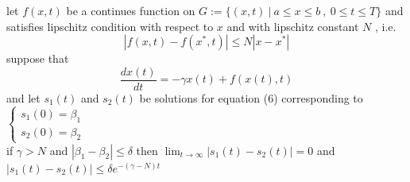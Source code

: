\documentclass[]{article}
\begin{document}
\begin{theorem}[]
    let $f(x,t)$ be a continues function on $G:=\{(x,t) \ | \ a\leq x\leq b \ , \ 0\leq t \leq T\}$ and
    \\
    satisfies lipschitz condition with respect to $x$ and with lipschitz constant $N$ , i.e.
    \[
        \left\lvert f(x,t) - f(x^*,t)\right\rvert \leq N \left\lvert x - x^*\right\rvert      
    \]
    suppose that 
    \begin{equation}
        \frac{dx(t)}{dt} = -\gamma x(t) + f(x(t),t)
    \end{equation}
    and let $s_1(t)$ and $s_2(t)$ be solutions for equation (6) corresponding to 
    $
    \begin{cases}
        s_1(0) = \beta_1  
        \\
        s_2(0) = \beta_2
    \end{cases}
    $
    \\
    if $\gamma >N$ and $\left\lvert \beta_1 - \beta_2 \right\rvert \leq \delta $ then $\displaystyle \lim_{t \to \infty}|s_1(t) - s_2(t)| = 0 $
    and $|s_1(t) - s_2(t)| \leq \delta e^{-(\gamma-N)t}$
\end{theorem}
\end{document}
